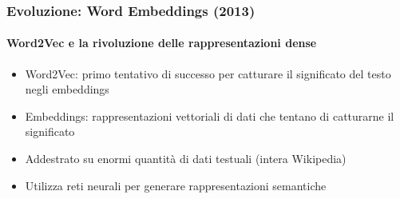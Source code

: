 %
\begin{frame}[t,fragile] \frametitle{Evoluzione: Word Embeddings (2013)}
	{\scriptsize
		\onslide<1->
            \framesubtitle{Word2Vec e la rivoluzione delle rappresentazioni dense}
            \vspace*{-15pt}
	    	\begin{minipage}[t]{\textwidth}
				\begin{minipage}[t]{0.6\textwidth}
	    			\begin{itemize}[leftmargin=10pt,align=right]
						\onslide<2->\item[\alert{\faHandORight}] \alert{Word2Vec:} primo tentativo di successo per catturare il significato del testo negli embeddings
						\onslide<3->\item[\alert{\faHandORight}] \alert{Embeddings:} rappresentazioni vettoriali di dati che tentano di catturarne il significato
						\onslide<4->\item[\alert{\faHandORight}] Addestrato su \alert{enormi quantità} di dati testuali (intera Wikipedia)
						\onslide<5->\item[\alert{\faHandORight}] Utilizza \alert{reti neurali} per generare rappresentazioni semantiche
					\end{itemize}
            	\end{minipage}
	    	\end{minipage}
	}
\end{frame}
%
